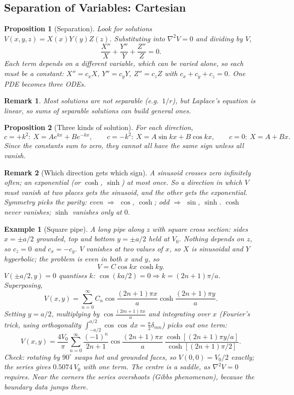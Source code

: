\documentclass{article}
\newtheorem*{example}{Example}
\newtheorem{remark}{Remark}
\newtheorem{proposition}{Proposition}
\begin{document}
\subsection{Separation of Variables: Cartesian}
\begin{proposition}[Separation]
    Look for solutions $V(x,y,z) = X(x)Y(y)Z(z)$. Substituting into $\nabla^2 V = 0$ and dividing by $V$,
    \[\frac{X''}{X} + \frac{Y''}{Y} + \frac{Z''}{Z} = 0.\]
    Each term depends on a different variable, which can be varied alone, so each must be a constant: $X'' = c_xX$, $Y'' = c_yY$, $Z'' = c_zZ$ with $c_x + c_y + c_z = 0$. One PDE becomes three ODEs.
\end{proposition}
\begin{remark}
    Most solutions are not separable (e.g.\ $1/r$), but Laplace's equation is linear, so sums of separable solutions can build general ones.
\end{remark}
\begin{proposition}[Three kinds of solution]
    For each direction,
    \[c = +k^2:\ X = Ae^{kx} + Be^{-kx}, \qquad c = -k^2:\ X = A\sin kx + B\cos kx, \qquad c = 0:\ X = A + Bx.\]
    Since the constants sum to zero, they cannot all have the same sign unless all vanish.
\end{proposition}
\begin{remark}[Which direction gets which sign]
    A sinusoid crosses zero infinitely often; an exponential (or $\cosh$, $\sinh$) at most once. So a direction in which $V$ must vanish at two places gets the sinusoid, and the other gets the exponential. Symmetry picks the parity: even $\Rightarrow$ $\cos$, $\cosh$; odd $\Rightarrow$ $\sin$, $\sinh$. $\cosh$ never vanishes; $\sinh$ vanishes only at $0$.
\end{remark}
\begin{example}[Square pipe]
    A long pipe along $z$ with square cross section: sides $x = \pm a/2$ grounded, top and bottom $y = \pm a/2$ held at $V_0$. Nothing depends on $z$, so $c_z = 0$ and $c_x = -c_y$. $V$ vanishes at two values of $x$, so $X$ is sinusoidal and $Y$ hyperbolic; the problem is even in both $x$ and $y$, so
    \[V = C\cos kx\,\cosh ky.\]
    $V(\pm a/2, y) = 0$ quantises $k$: $\cos(ka/2) = 0 \Rightarrow k = (2n+1)\pi/a$. Superposing,
    \[V(x,y) = \sum_{n=0}^\infty C_n\cos\frac{(2n+1)\pi x}{a}\cosh\frac{(2n+1)\pi y}{a}.\]
    Setting $y = a/2$, multiplying by $\cos\frac{(2m+1)\pi x}{a}$ and integrating over $x$ (Fourier's trick, using orthogonality $\int_{-a/2}^{a/2}\cos\cos\,dx = \frac{a}{2}\delta_{mn}$) picks out one term:
    \[V(x,y) = \frac{4V_0}{\pi}\sum_{n=0}^{\infty}\frac{(-1)^n}{2n+1}\cos\frac{(2n+1)\pi x}{a}\,\frac{\cosh\left[(2n+1)\pi y/a\right]}{\cosh\left[(2n+1)\pi/2\right]}.\]
    Check: rotating by $90^\circ$ swaps hot and grounded faces, so $V(0,0) = V_0/2$ exactly; the series gives $0.5074\,V_0$ with one term. The centre is a saddle, as $\nabla^2 V = 0$ requires. Near the corners the series overshoots (Gibbs phenomenon), because the boundary data jumps there.
\end{example}
\end{document}
